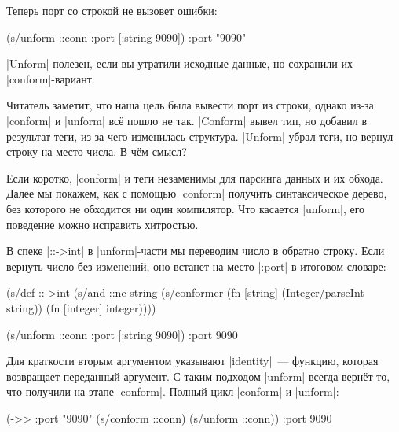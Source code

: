 \noindent
Теперь порт со строкой не вызовет ошибки:

\begin{english}
  \begin{clojure}
(s/unform ::conn {:port [:string 9090]})
{:port "9090"}
  \end{clojure}
\end{english}

\spverb|Unform| полезен, если вы утратили исходные данные, но сохранили их
\spverb|conform|-вариант.

Читатель заметит, что наша цель была вывести порт из строки, однако из-за
\spverb|conform| и \spverb|unform| вс\"{е} пошло не так. \spverb|Conform| вывел тип,
но добавил в результат теги, из-за чего изменилась структура. \spverb|Unform|
убрал теги, но вернул строку на место числа. В ч\"{е}м смысл?

Если коротко, \spverb|conform| и теги незаменимы для парсинга данных и их
обхода. Далее мы покажем, как с помощью \spverb|conform| получить синтаксическое
дерево, без которого не обходится ни один компилятор. Что касается
\spverb|unform|, его поведение можно исправить хитростью.

В спеке \spverb|::->int| в \spverb|unform|-части мы переводим число в обратно
строку. Если вернуть число без изменений, оно встанет на место \spverb|:port| в
итоговом словаре:

\begin{english}
  \begin{clojure}
(s/def ::->int
  (s/and
   ::ne-string
   (s/conformer
    (fn [string]
      (Integer/parseInt string))
    (fn [integer]
      integer))))

(s/unform ::conn {:port [:string 9090]})
{:port 9090}
  \end{clojure}
\end{english}


Для краткости вторым аргументом указывают \spverb|identity|~--- функцию, которая
возвращает переданный аргумент. С таким подходом \spverb|unform| всегда
верн\"{е}т то, что получили на этапе \spverb|conform|. Полный цикл
\spverb|conform| и \spverb|unform|:

\begin{english}
  \begin{clojure}
(->> {:port "9090"}
     (s/conform ::conn)
     (s/unform ::conn))
{:port 9090}
  \end{clojure}
\end{english}

